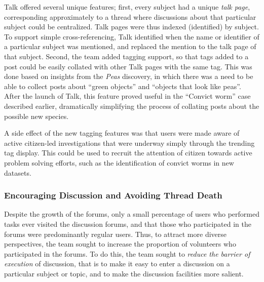 \documentclass{sigchi}
\begin{document}
Talk offered several unique features; first, every subject had a unique \emph{talk page}, corresponding approximately to a thread where discussions about that particular subject could be centralized.  Talk pages were thus indexed (identified) by subject.  To support simple cross-referencing, Talk identified when the name or identifier of a particular subject was mentioned, and replaced the mention to the talk page of that subject.  Second, the team added tagging support, so that tags added to a post could be easily collated with other Talk pages with the same tag. This was done based on insights from the \emph{Peas} discovery, in which there was a need to be able to collect posts about ``green objects'' and ``objects that look like peas''.  After the launch of Talk, this feature proved useful in the ``Convict worm'' case described earlier, dramatically simplifying the process of collating posts about the possible new species.  

A side effect of the new tagging features was that users were made aware of active citizen-led investigations that were underway simply through the trending tag display.  This could be used to recruit the attention of citizen towards active problem solving efforts, such as the identification of convict worms in new datasets.

\subsubsection{Encouraging Discussion and Avoiding Thread Death}
	

Despite the growth of the forums, only a small percentage of users who performed tasks ever visited the discussion forums, and that those who participated in the forums were predominantly regular users. Thus, to attract more diverse perspectives, the team sought to increase the proportion of volunteers who participated in the forums.  To do this, the team sought to \emph{reduce the barrier of execution} of discussion, that is to make it easy to enter a discussion on a particular subject or topic, and to make the discussion facilities more salient\cite{norman2002design}.  
\end{document}

